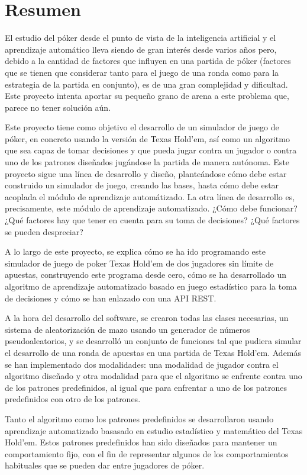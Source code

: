 \chapter{Resumen}

El estudio del póker desde el punto de vista de la inteligencia artificial y el aprendizaje automático lleva siendo de gran interés desde varios años pero, debido a la cantidad de factores que influyen en una partida de póker (factores que se tienen que considerar tanto para el juego de una ronda como para la estrategia de la partida  en conjunto), es de una gran complejidad y dificultad. Este proyecto intenta aportar su pequeño grano de arena a este problema que, parece no tener solución aún.


Este proyecto tiene como objetivo el desarrollo de un simulador de juego de póker, en concreto usando la versión de Texas Hold'em, así como un algoritmo que sea capaz de tomar decisiones y que pueda jugar contra un jugador o contra uno de los patrones diseñados jugándose la partida de manera autónoma.  Este proyecto sigue una línea de desarrollo y diseño, planteándose cómo debe estar construido un simulador de juego, creando las bases, hasta cómo debe estar acoplada el módulo de aprendizaje automátizado.
 La otra línea de desarrollo es, precisamente, este módulo de aprendizaje automatizado. ¿Cómo debe funcionar? ¿Qué factores hay que tener en cuenta para su toma de decisiones? ¿Qué factores se pueden despreciar?

A lo largo de este proyecto, se explica cómo se ha ido programando este simulador de juego de poker Texas Hold'em de dos jugadores sin límite de apuestas, construyendo este programa desde cero, cómo se ha desarrollado un algoritmo de aprendizaje automatizado basado en juego estadístico para la toma de decisiones y cómo se han enlazado con una API REST. 

A la hora del desarrollo del software, se crearon todas las clases necesarias, un sistema de aleatorización de mazo usando un generador de números pseudoaleatorios, y se desarrolló un conjunto de funciones tal que pudiera simular el desarrollo de una ronda de apuestas en una partida de Texas Hold'em. Además se han implementado dos modalidades: una modalidad de jugador contra el algoritmo diseñado y otra modalidad para que el algoritmo se enfrente contra uno de los patrones predefinidos, al igual que para enfrentar a uno de los patrones predefinidos con otro de los patrones.

Tanto el algoritmo como los patrones predefinidos se desarrollaron usando aprendizaje automatizado basasado en estudio estadístico y matemático del Texas Hold'em. Estos patrones predefinidos han sido diseñados para mantener un comportamiento fijo, con el fin de representar algunos de los comportamientos habituales que se pueden dar entre jugadores de póker.

